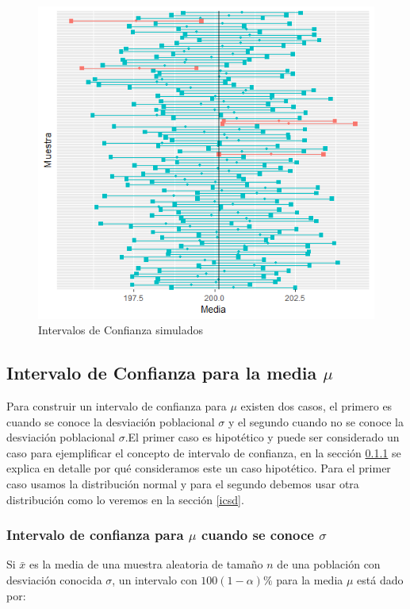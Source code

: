 \documentclass[]{book}
\begin{document}
\begin{figure}[h!]

{\centering \includegraphics[width=0.7\linewidth]{ic} 

}

\caption{Intervalos de Confianza simulados}\label{fig:ic}
\end{figure}

\hypertarget{icmu}{%
\subsection{\texorpdfstring{Intervalo de Confianza para la media \(\mu\)}{Intervalo de Confianza para la media \textbackslash{}mu}}\label{icmu}}

Para construir un intervalo de confianza para \(\mu\) existen dos casos, el primero es cuando se conoce la desviación poblacional \(\sigma\) y el segundo cuando no se conoce la desviación poblacional \(\sigma\).El primer caso es hipotético y puede ser considerado un caso para ejemplificar el concepto de intervalo de confianza, en la sección \ref{jt} se explica en detalle por qué consideramos este un caso hipotético. Para el primer caso usamos la distribución normal y para el segundo debemos usar otra distribución como lo veremos en la sección \ref{icsd}.

\hypertarget{jt}{%
\subsubsection{\texorpdfstring{Intervalo de confianza para \(\mu\) cuando se conoce \(\sigma\)}{Intervalo de confianza para \textbackslash{}mu cuando se conoce \textbackslash{}sigma}}\label{jt}}

Si \(\bar{x}\) es la media de una muestra aleatoria de tamaño \(n\) de una población con desviación conocida \(\sigma\), un intervalo con \(100\left(1-\alpha\right)\%\) para la media \(\mu\) está dado por:
\end{document}
